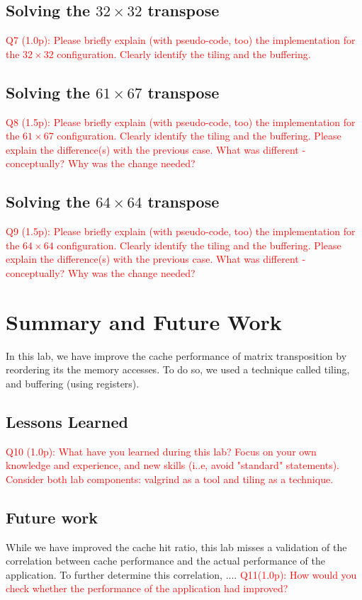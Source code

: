 \documentclass[11pt]{article}
\newcommand \question[1]{\textcolor{red}{#1}}
\begin{document}
\subsection*{Solving the $32 \times 32$ transpose}
\question{Q7 (1.0p): Please briefly explain (with pseudo-code, too) the implementation for the $32 \times 32$ configuration. Clearly identify the tiling and the buffering.}  

\subsection*{Solving the $61 \times 67$ transpose}
\question{Q8 (1.5p): Please briefly explain (with pseudo-code, too) the implementation for the $61 \times 67$ configuration. Clearly identify the tiling and the buffering. Please explain the difference(s) with the previous case. What was different - conceptually? Why was the change needed?}  

\subsection*{Solving the $64 \times 64$ transpose}
\question{Q9 (1.5p): Please briefly explain (with pseudo-code, too) the implementation for the $64 \times 64$ configuration. Clearly identify the tiling and the buffering. Please explain the difference(s) with the previous case. What was different - conceptually? Why was the change needed?}  

\section{Summary and Future Work }
In this lab, we have improve the cache performance of matrix transposition by reordering its the memory accesses. To do so, we used a technique called tiling, and buffering (using registers). 
 
\subsection*{Lessons Learned} 
\question{Q10 (1.0p): What have you learned during this lab? Focus on your own knowledge and experience, and new skills (i..e, avoid "standard" statements). Consider both lab components: valgrind as a tool and tiling as a technique. } 

\subsection*{Future work}
While we have improved the cache hit ratio, this lab misses a validation of the correlation between cache performance and the actual performance of the application. To further determine this correlation, ....  
\question{Q11(1.0p): How would you check whether the performance of the application had improved?} 
\end{document}
